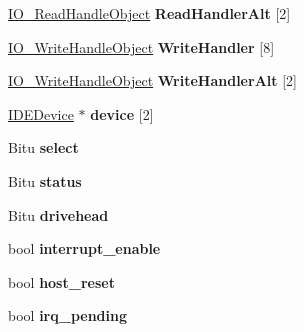 \begin{DoxyCompactItemize}
\item 
\hypertarget{classIDEController_a41a8d5ac984d7dae6521737ca8d10728}{\hyperlink{classIO__ReadHandleObject}{I\-O\-\_\-\-Read\-Handle\-Object} {\bfseries Read\-Handler\-Alt} \mbox{[}2\mbox{]}}\label{classIDEController_a41a8d5ac984d7dae6521737ca8d10728}

\item 
\hypertarget{classIDEController_a0448c2ca37a3e1fd83ae37a0a18a30a7}{\hyperlink{classIO__WriteHandleObject}{I\-O\-\_\-\-Write\-Handle\-Object} {\bfseries Write\-Handler} \mbox{[}8\mbox{]}}\label{classIDEController_a0448c2ca37a3e1fd83ae37a0a18a30a7}

\item 
\hypertarget{classIDEController_aa158d0cc8c724cee3e3a54500f9c0b82}{\hyperlink{classIO__WriteHandleObject}{I\-O\-\_\-\-Write\-Handle\-Object} {\bfseries Write\-Handler\-Alt} \mbox{[}2\mbox{]}}\label{classIDEController_aa158d0cc8c724cee3e3a54500f9c0b82}

\item 
\hypertarget{classIDEController_a2db6e57639dc48a4149f89328b917e53}{\hyperlink{classIDEDevice}{I\-D\-E\-Device} $\ast$ {\bfseries device} \mbox{[}2\mbox{]}}\label{classIDEController_a2db6e57639dc48a4149f89328b917e53}

\item 
\hypertarget{classIDEController_a6c3e12d1ad54253b4a730a4ddd60a60a}{Bitu {\bfseries select}}\label{classIDEController_a6c3e12d1ad54253b4a730a4ddd60a60a}

\item 
\hypertarget{classIDEController_ae3300fc01672b71d86035886488b8cbf}{Bitu {\bfseries status}}\label{classIDEController_ae3300fc01672b71d86035886488b8cbf}

\item 
\hypertarget{classIDEController_a9b217c53798bf8880379685a5004daf9}{Bitu {\bfseries drivehead}}\label{classIDEController_a9b217c53798bf8880379685a5004daf9}

\item 
\hypertarget{classIDEController_a2a949cdebfae82511cb5ece769ed5459}{bool {\bfseries interrupt\-\_\-enable}}\label{classIDEController_a2a949cdebfae82511cb5ece769ed5459}

\item 
\hypertarget{classIDEController_a64a317bc7665107d88685f9ea831b408}{bool {\bfseries host\-\_\-reset}}\label{classIDEController_a64a317bc7665107d88685f9ea831b408}

\item 
\hypertarget{classIDEController_a64d0eeca7e46035b49d66a62e894bff6}{bool {\bfseries irq\-\_\-pending}}\label{classIDEController_a64d0eeca7e46035b49d66a62e894bff6}


\end{DoxyCompactItemize}
